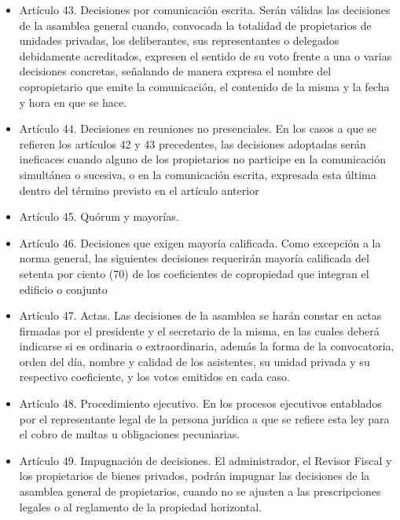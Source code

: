 \begin{itemize}
\begin{itemize}
\item Artículo 43. Decisiones por comunicación escrita. Serán válidas las decisiones de la asamblea general cuando, convocada la totalidad de propietarios de unidades privadas, los deliberantes, sus representantes o delegados debidamente acreditados, expresen el sentido de su voto frente a una o varias decisiones concretas, señalando de manera expresa el nombre del copropietario que emite la comunicación, el contenido de la misma y la fecha y hora en que se hace. 

\item Artículo 44. Decisiones en reuniones no presenciales. En los casos a que se refieren los artículos 42 y 43 precedentes, las decisiones adoptadas serán ineficaces cuando alguno de los propietarios no participe en la comunicación simultánea o sucesiva, o en la comunicación escrita, expresada esta última dentro del término previsto en el artículo anterior

\item Artículo 45. Quórum y mayorías. 

\item Artículo 46. Decisiones que exigen mayoría calificada. Como excepción a la norma general, las siguientes decisiones requerirán mayoría calificada del setenta por ciento (70) de los coeficientes de copropiedad que integran el edificio o conjunto

\item Artículo 47. Actas. Las decisiones de la asamblea se harán constar en actas firmadas por el presidente y el secretario de la misma, en las cuales deberá indicarse si es ordinaria o extraordinaria, además la forma de la convocatoria, orden del día, nombre y calidad de los asistentes, su unidad privada y su respectivo coeficiente, y los votos emitidos en cada caso. 

\item Artículo 48. Procedimiento ejecutivo. En los procesos ejecutivos entablados por el representante legal de la persona jurídica a que se refiere esta ley para el cobro de multas u obligaciones pecuniarias.

\item Artículo 49. Impugnación de decisiones. El administrador, el Revisor Fiscal y los propietarios de bienes privados, podrán impugnar las decisiones de la asamblea general de propietarios, cuando no se ajusten a las prescripciones legales o al reglamento de la propiedad horizontal.
\end{itemize}
\end{itemize}

